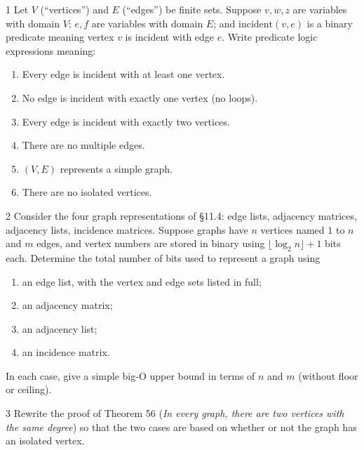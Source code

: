 
\begin{exercise}{1}
    Let $V$ (``vertices'') and $E$ (``edges'') be finite sets. Suppose $v,w,z$
    are variables with domain $V$; $e,f$ are variables with domain $E$; and
    $\mathrm{incident}(v,e)$ is a binary predicate meaning vertex $v$ is incident
    with edge $e$. Write predicate logic expressions meaning:
    \begin{enumerate}[label=(\alph*)]
        \item Every edge is incident with at least one vertex.
        \item No edge is incident with exactly one vertex (no loops).
        \item Every edge is incident with exactly two vertices.
        \item There are no multiple edges.
        \item $(V,E)$ represents a simple graph.
        \item There are no isolated vertices.
    \end{enumerate}
\end{exercise}

\begin{exercise}{2}
    Consider the four graph representations of \S11.4: edge lists, adjacency
    matrices, adjacency lists, incidence matrices. Suppose graphs have $n$
    vertices named $1$ to $n$ and $m$ edges, and vertex numbers are stored in
    binary using $\lfloor\log_2n\rfloor+1$ bits each. Determine the total number
    of bits used to represent a graph using
    \begin{enumerate}[label=(\alph*)]
        \item an edge list, with the vertex and edge sets listed in full;
        \item an adjacency matrix;
        \item an adjacency list;
        \item an incidence matrix.
    \end{enumerate}
    In each case, give a simple big-O upper bound in terms of $n$ and $m$
    (without floor or ceiling).
\end{exercise}

\begin{exercise}{3}
    Rewrite the proof of Theorem 56 (\emph{In every graph, there are two
    vertices with the same degree}) so that the two cases are based on whether
    or not the graph has an isolated vertex.
\end{exercise}

